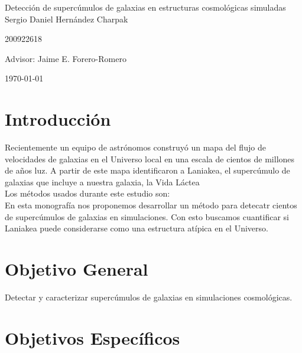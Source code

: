 \documentclass[12pt]{article}
\begin{document}
\begin{center}
\Huge
Detecci\'on de superc\'{u}mulos de galaxias en estructuras
cosmol\'{o}gicas simuladas\\  
\vspace{3mm}
\Large Sergio Daniel Hern\'{a}ndez Charpak

\large
200922618

\vspace{2mm}
\Large
Advisor: Jaime E. Forero-Romero

\normalsize
\vspace{2mm}

\today
\end{center}


\normalsize
\section{Introducci\'{o}n}

Recientemente un equipo de astr\'onomos construy\'o un mapa del flujo
de velocidades de galaxias en el Universo local en una escala de
cientos de millones de a\~nos luz.
A partir de este mapa identificaron a Laniakea, el superc\'umulo de galaxias que
incluye a nuestra galaxia, la Vida L\'{a}ctea
\\  


Los m\'{e}todos usados durante este estudio son:
\\

En esta monograf\'{i}a nos proponemos desarrollar un m\'etodo para
detecatr cientos de superc\'{u}mulos de galaxias en simulaciones. 
Con esto buscamos cuantificar si Laniakea puede considerarse como una
estructura at\'ipica en el Universo.
\\

\section{Objetivo General}

Detectar y caracterizar superc\'{u}mulos de galaxias en simulaciones
cosmol\'{o}gicas. 
\\

\section{Objetivos Espec\'{i}ficos}
\end{document}
